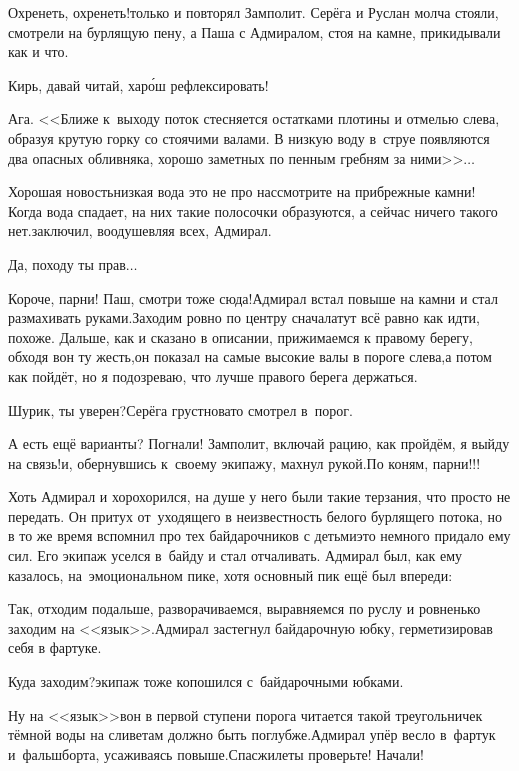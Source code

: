 \diagdash Охренеть, охренеть!\mdash только и повторял Замполит. Серёга и Руслан молча стояли, смотрели на бурлящую пену, а Паша с Адмиралом, стоя на камне, прикидывали как и что.

\diagdash Кирь, давай читай, хар{\'о}ш рефлексировать!

\diagdash Ага. <<Ближе к~выходу поток стесняется остатками плотины и отмелью слева, образуя крутую горку со стоячими валами. В низкую воду в~струе появляются два опасных обливняка, хорошо заметных по пенным гребням за ними>>$\ldots$

\diagdash Хорошая новость\mdash низкая вода это не про нас\mdash смотрите на прибрежные камни! Когда вода спадает, на них такие полосочки образуются, а сейчас ничего такого нет.\mdash заключил, воодушевляя всех, Адмирал.

\diagdash Да, походу ты прав$\ldots$

\diagdash Короче, парни! Паш, смотри тоже сюда!\mdash Адмирал встал повыше на камни и стал размахивать руками.\mdash Заходим ровно по центру сначала\mdash тут всё равно как идти, похоже. Дальше, как и сказано в описании, прижимаемся к правому берегу, обходя вон ту жесть,\mdash он показал на самые высокие валы в пороге слева,\mdash а потом как пойдёт, но я подозреваю, что лучше правого берега держаться.

\diagdash Шурик, ты уверен?\mdash Серёга грустновато смотрел в~порог.

\diagdash А есть ещё варианты? Погнали! Замполит, включай рацию, как пройдём, я выйду на связь!\mdash и, обернувшись к~своему экипажу, махнул рукой.\mdash По коням, парни!!!

Хоть Адмирал и хорохорился, на душе у него были такие терзания, что просто не передать. Он притух от~уходящего в неизвестность белого бурлящего потока, но в то же время вспомнил про тех байдарочников с детьми\mdash это немного придало ему сил. Его экипаж уселся в~байду и стал отчаливать. Адмирал был, как ему казалось, на~эмоциональном пике, хотя основный пик ещё был впереди:

\diagdash Так, отходим подальше, разворачиваемся, выравняемся по руслу и ровненько заходим на <<язык>>.\mdash Адмирал застегнул байдарочную юбку, герметизировав себя в фартуке.

\diagdash Куда заходим?\mdash экипаж тоже копошился с~байдарочными юбками.

\diagdash Ну на <<язык>>\mdash вон в первой ступени порога читается такой треугольничек тёмной воды на сливе\mdash там должно быть поглубже.\mdash Адмирал упёр весло в~фартук и~фальшборта, усаживаясь повыше.\mdash Спасжилеты проверьте! Начали!

